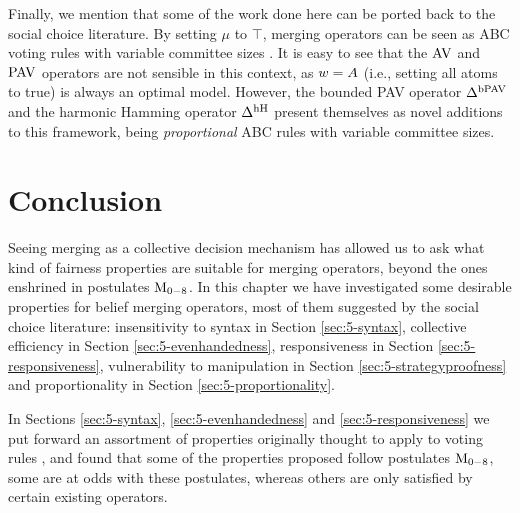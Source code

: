 Finally, we mention that some of the work done here can be ported back to the social 
choice literature. By setting $\mu$ to $\top$, 
merging operators can be seen as ABC voting rules 
with variable committee sizes \cite{Kilgour16,Faliszewski17OA}.
It is easy to see that the $\mathrm{AV}$ and $\mathrm{PAV}$ operators are not sensible in this context, 
as $w=A$ (i.e., setting all atoms to true) is always an optimal model.
However, the 
bounded PAV operator $\Delta^{\mathrm{bPAV}}$
and the harmonic Hamming operator $\Delta^{\mathrm{hH}}$ present themselves as novel additions to this framework,
being \emph{proportional} ABC rules with variable committee sizes.











\section{Conclusion}
Seeing merging as a collective decision mechanism
has allowed us to ask what kind of fairness properties 
are suitable for merging operators, beyond the ones 
enshrined in postulates $\mathrm{M}_{0-8}$.
In this chapter we have investigated 
some desirable properties for belief merging operators,
most of them suggested by the social choice literature:
insensitivity to syntax in Section \ref{sec:5-syntax},
collective efficiency in Section \ref{sec:5-evenhandedness},
responsiveness in Section \ref{sec:5-responsiveness},
vulnerability to manipulation in Section \ref{sec:5-strategyproofness}
and proportionality in Section \ref{sec:5-proportionality}.

In Sections \ref{sec:5-syntax}, \ref{sec:5-evenhandedness} and \ref{sec:5-responsiveness}
we put forward an assortment of properties originally thought 
to apply to voting rules \cite{Zwicker16,BaumeisterR16}, and found
that some of the properties proposed follow postulates $\mathrm{M}_{0-8}$, 
some are at odds with these postulates, 
whereas others are only satisfied by certain existing operators.

